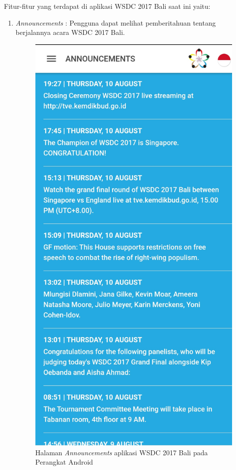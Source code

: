 Fitur-fitur yang terdapat di aplikasi WSDC 2017 Bali saat ini yaitu:

\begin{enumerate}
	\item {\it Announcements} : Pengguna dapat melihat pemberitahuan tentang berjalannya acara WSDC 2017 Bali.

	\begin{figure}[H]
	    \centering
	    \includegraphics[scale=0.12]{Gambar/Announcements.jpg}
	    \caption{Halaman {\it Announcements} aplikasi WSDC 2017 Bali pada Perangkat Android}
	    \label{fig:wsdcappannouncements}
	\end{figure}


\end{enumerate}
